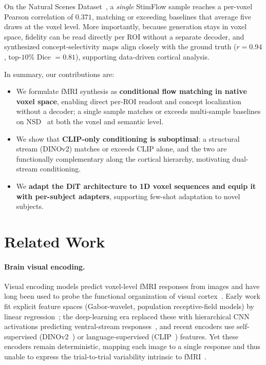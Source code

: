 \documentclass[runningheads]{llncs}
\begin{document}
On the Natural Scenes Dataset~\cite{nsd}, a \emph{single} StimFlow sample reaches
a per-voxel Pearson correlation of $0.371$, matching or exceeding baselines that average
five draws at the voxel level.
More importantly, because generation stays in voxel space, fidelity can be read directly
per ROI without a separate decoder, and synthesized concept-selectivity maps align closely
with the ground truth ($r=0.94$, top-$10\%$ Dice $=0.81$), supporting data-driven cortical analysis.

In summary, our contributions are:
\begin{itemize}
  \item We formulate fMRI synthesis as \textbf{conditional flow matching in native voxel
    space}, enabling direct per-ROI readout and concept localization without a decoder;
    a single sample matches or exceeds multi-sample baselines on NSD~\cite{nsd}
    at both the voxel and semantic level.
  \item We show that \textbf{CLIP-only conditioning is suboptimal}: a structural
    stream (DINOv2) matches or exceeds CLIP alone, and the two are functionally
    complementary along the cortical hierarchy, motivating dual-stream conditioning.
  \item We \textbf{adapt the DiT architecture to 1D voxel sequences and equip it with
    per-subject adapters}, supporting few-shot adaptation to novel subjects.
\end{itemize}

\section{Related Work}
\label{sec:related}

\paragraph{Brain visual encoding.}
Visual encoding models predict voxel-level fMRI responses from images and have long been used
to probe the functional organization of visual cortex~\cite{naselaris2011}. Early work fit
explicit feature spaces (Gabor-wavelet, population receptive-field models) by linear
regression~\cite{kay2008,Haxby2001DistributedAO,Mitchell2008PredictingHB}; the deep-learning
era replaced these with hierarchical CNN activations predicting ventral-stream
responses~\cite{yamins2014,guclu2015,algonauts2023}, and recent encoders use self-supervised
(DINOv2~\cite{dinov2}) or language-supervised (CLIP~\cite{clip}) features. Yet these encoders
remain deterministic, mapping each image to a single response and thus unable to express the
trial-to-trial variability intrinsic to fMRI~\cite{nsd}.
\end{document}
